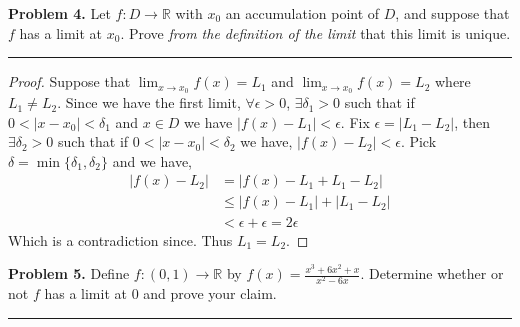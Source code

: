 \documentclass[leqno]{article}
\theoremstyle{nonumberplain}
\newtheorem{proof}{Proof}
\begin{document}
\noindent\textbf{Problem 4.} Let $f \colon D \to \mathbb{R}$ with $x_0$ an accumulation point of $D$, and suppose that $f$ has a limit at $x_0$. Prove \emph{from the definition of the limit} that this limit is unique.

\noindent\rule[0.5ex]{\linewidth}{1pt}

\begin{proof}
Suppose that $\lim_{x\to x_0} f(x) = L_1$ and $\lim_{x\to x_0}f(x)=L_2$ where $L_1 \neq L_2$.  Since we have the first limit, $\forall \epsilon >0$, $\exists \delta_1 >0$ such that if $0<|x-x_0|<\delta_1$ and $x\in D$ we have $|f(x)-L_1|<\epsilon$. Fix $\epsilon = |L_1 - L_2|$, then $\exists \delta_2 > 0$ such that if $0<|x-x_0|<\delta_2$ we have, $|f(x)-L_2|<\epsilon$. Pick $\delta = \min\{\delta_1,\delta_2\}$ and we have,
\begin{align*}
|f(x)-L_2|&=|f(x)-L_1+L_1-L_2|\\
&\leq |f(x)-L_1|+|L_1-L_2|\\
&<\epsilon + \epsilon = 2\epsilon
\end{align*}
Which is a contradiction since.  Thus $L_1=L_2$.
\end{proof}

\pagebreak




\noindent\textbf{Problem 5.} Define $f \colon (0,1) \to \mathbb{R}$ by $f(x) = \frac{x^3 + 6x^2 +x}{x^2 -6x}$. Determine whether or not $f$ has a limit at $0$ and prove your claim.


\noindent\rule[0.5ex]{\linewidth}{1pt}
\end{document}
